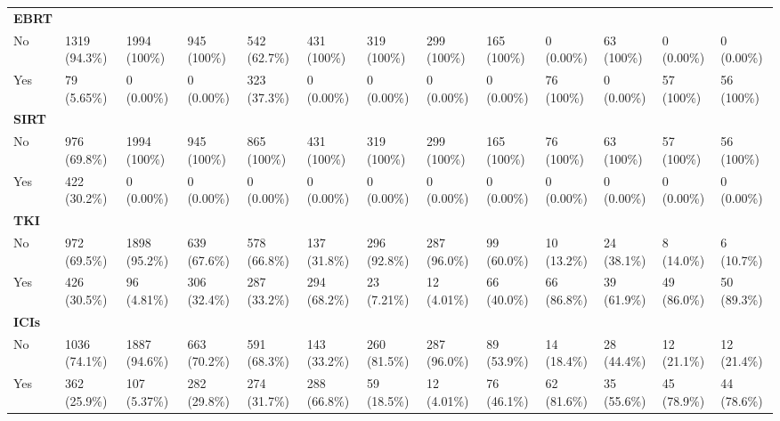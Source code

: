 \documentclass{article}
\begin{document}
\begin{landscape}
\begin{tiny}
\begin{tabularx}{\linewidth}{p{2.0cm}|X|X|X|X|X|X|X|X|X|X|X|X}
\rowcolor{gray!30}
\textbf{EBRT }  &  &  &  &  &  &  &  &  &  &  &  &  \\
\rowcolor{gray!10}
    No &   1319 (94.3\%)   &   1994 (100\%)    &    945 (100\%)    &   542 (62.7\%)    &    431 (100\%)    &    319 (100\%)    &    299 (100\%)    &    165 (100\%)    &    0 (0.00\%)     &    63 (100\%)     &    0 (0.00\%)     &    0 (0.00\%)     \\
\rowcolor{gray!10}
    Yes &    79 (5.65\%)    &    0 (0.00\%)     &    0 (0.00\%)     &   323 (37.3\%)    &    0 (0.00\%)     &    0 (0.00\%)     &    0 (0.00\%)     &    0 (0.00\%)     &    76 (100\%)     &    0 (0.00\%)     &    57 (100\%)     &    56 (100\%)     \\
\rowcolor{gray!30}
\textbf{SIRT }  &  &  &  &  &  &  &  &  &  &  &  &  \\
\rowcolor{gray!10}
    No &   976 (69.8\%)    &   1994 (100\%)    &    945 (100\%)    &    865 (100\%)    &    431 (100\%)    &    319 (100\%)    &    299 (100\%)    &    165 (100\%)    &    76 (100\%)     &    63 (100\%)     &    57 (100\%)     &    56 (100\%)     \\
\rowcolor{gray!10}
    Yes &   422 (30.2\%)    &    0 (0.00\%)     &    0 (0.00\%)     &    0 (0.00\%)     &    0 (0.00\%)     &    0 (0.00\%)     &    0 (0.00\%)     &    0 (0.00\%)     &    0 (0.00\%)     &    0 (0.00\%)     &    0 (0.00\%)     &    0 (0.00\%)     \\
\rowcolor{gray!30}
\textbf{TKI }  &  &  &  &  &  &  &  &  &  &  &  &  \\
\rowcolor{gray!10}
    No &   972 (69.5\%)    &   1898 (95.2\%)   &   639 (67.6\%)    &   578 (66.8\%)    &   137 (31.8\%)    &   296 (92.8\%)    &   287 (96.0\%)    &    99 (60.0\%)    &    10 (13.2\%)    &    24 (38.1\%)    &    8 (14.0\%)     &    6 (10.7\%)     \\
\rowcolor{gray!10}
    Yes &   426 (30.5\%)    &    96 (4.81\%)    &   306 (32.4\%)    &   287 (33.2\%)    &   294 (68.2\%)    &    23 (7.21\%)    &    12 (4.01\%)    &    66 (40.0\%)    &    66 (86.8\%)    &    39 (61.9\%)    &    49 (86.0\%)    &    50 (89.3\%)    \\
\rowcolor{gray!30}
\textbf{ICIs }  &  &  &  &  &  &  &  &  &  &  &  &  \\
\rowcolor{gray!10}
    No &   1036 (74.1\%)   &   1887 (94.6\%)   &   663 (70.2\%)    &   591 (68.3\%)    &   143 (33.2\%)    &   260 (81.5\%)    &   287 (96.0\%)    &    89 (53.9\%)    &    14 (18.4\%)    &    28 (44.4\%)    &    12 (21.1\%)    &    12 (21.4\%)    \\
\rowcolor{gray!10}
    Yes &   362 (25.9\%)    &   107 (5.37\%)    &   282 (29.8\%)    &   274 (31.7\%)    &   288 (66.8\%)    &    59 (18.5\%)    &    12 (4.01\%)    &    76 (46.1\%)    &    62 (81.6\%)    &    35 (55.6\%)    &    45 (78.9\%)    &    44 (78.6\%)    \\

\end{tabularx}
\end{tiny}
\end{landscape}
\end{document}
